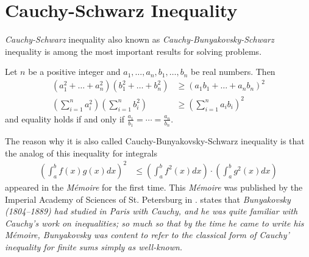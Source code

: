 \documentclass{subfile}
\begin{document}
	\section{Cauchy-Schwarz Inequality}\label{sec:cs}
	\textit{Cauchy-Schwarz} inequality also known as \textit{Cauchy-Bunyakovsky-Schwarz} inequality is among the most important results for solving problems.
		\begin{theorem}\label{thm:cs}
			Let $n$ be a positive integer and $a_1,\ldots,a_n,b_1,\ldots,b_n$ be real numbers. Then
				\begin{align}
					(a_1^2+\ldots+a_n^2)(b_1^2+\ldots+b_n^2)
						& \geq(a_1b_1+\ldots+a_nb_n)^2\label{ineq:cs}\\
					\left(\sum_{i=1}^na_i^2\right)\left(\sum_{i=1}^nb_i^2\right)
						& \geq\left(\sum_{i=1}^na_ib_i\right)^2\nonumber
				\end{align}
			and equality holds if and only if $\frac{a_1}{b_1}=\cdots=\frac{a_n}{b_n}$.
		\end{theorem}
	The reason why it is also called Cauchy-Bunyakovsky-Schwarz inequality is that the analog of this inequality for integrals
		\begin{align}
			\left(\int_{a}^{b}f(x)g(x)dx\right)^2
				& \leq\left(\int_{a}^{b}f^2(x)dx\right)\cdot\left(\int_{a}^{b}g^2(x)dx\right)\label{ineq:cbs}
		\end{align}
	appeared in the \textit{M\'{e}moire} \textcite[Page $4$]{bunyakovsky_1846} for the first time. This \textit{M\'{e}moire} was published by the Imperial Academy of Sciences of St. Petersburg in \textcite{bouniakowsky_1859}. \textcite[Page $10$]{steele_2010} states that \textit{Bunyakovsky (1804–1889) had studied in Paris with Cauchy, and he was quite familiar with Cauchy’s work on inequalities; so much so that by the time he came to write his M\'{e}moire, Bunyakovsky was content to refer to the classical form of Cauchy’ inequality for finite sums simply as well-known.}
	
\end{document}
